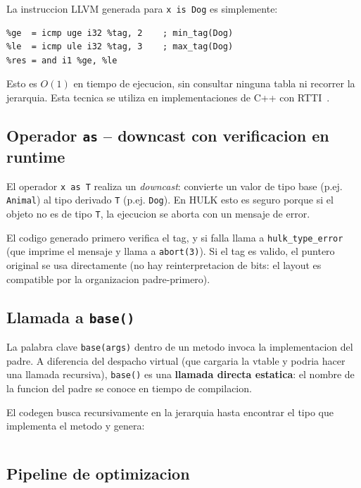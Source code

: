 \documentclass[12pt,a4paper]{article}
\begin{document}
La instruccion LLVM generada para \texttt{x is Dog} es simplemente:

\begin{lstlisting}[style=llvmir, numbers=none]
%tag = load i32, ptr %x
%ge  = icmp uge i32 %tag, 2    ; min_tag(Dog)
%le  = icmp ule i32 %tag, 3    ; max_tag(Dog)
%res = and i1 %ge, %le
\end{lstlisting}

Esto es $O(1)$ en tiempo de ejecucion, sin consultar ninguna tabla ni recorrer la
jerarquia. Esta tecnica se utiliza en implementaciones de C++ con RTTI~\cite{bjarne1994}.

\subsection{Operador \texttt{as} -- downcast con verificacion en runtime}

El operador \texttt{x as T} realiza un \textit{downcast}: convierte un valor de tipo
base (p.ej. \texttt{Animal}) al tipo derivado \texttt{T} (p.ej. \texttt{Dog}).
En HULK esto es seguro porque si el objeto no es de tipo \texttt{T}, la ejecucion
se aborta con un mensaje de error.

El codigo generado primero verifica el tag, y si falla llama a \texttt{hulk\_type\_error}
(que imprime el mensaje y llama a \texttt{abort(3)}). Si el tag es valido, el puntero
original se usa directamente (no hay reinterpretacion de bits: el layout es compatible
por la organizacion padre-primero).

\subsection{Llamada a \texttt{base()}}

La palabra clave \texttt{base(args)} dentro de un metodo invoca la implementacion del
padre. A diferencia del despacho virtual (que cargaria la vtable y podria hacer
una llamada recursiva), \texttt{base()} es una \textbf{llamada directa estatica}:
el nombre de la funcion del padre se conoce en tiempo de compilacion.

El codegen busca recursivamente en la jerarquia hasta encontrar el tipo que implementa
el metodo y genera:
\begin{lstlisting}[style=llvmir, numbers=none]
%result = call double @__hulk_method_Animal_speak(ptr %self, ...)
\end{lstlisting}

\subsection{Pipeline de optimizacion}
\end{document}
